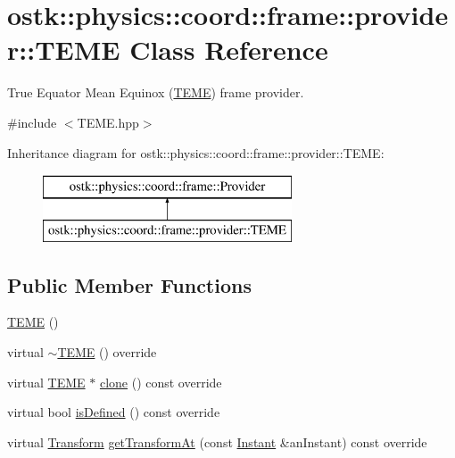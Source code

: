 \hypertarget{classostk_1_1physics_1_1coord_1_1frame_1_1provider_1_1_t_e_m_e}{}\section{ostk\+:\+:physics\+:\+:coord\+:\+:frame\+:\+:provider\+:\+:T\+E\+ME Class Reference}
\label{classostk_1_1physics_1_1coord_1_1frame_1_1provider_1_1_t_e_m_e}


True Equator Mean Equinox (\hyperlink{classostk_1_1physics_1_1coord_1_1frame_1_1provider_1_1_t_e_m_e}{T\+E\+ME}) frame provider.  




{\ttfamily \#include $<$T\+E\+M\+E.\+hpp$>$}

Inheritance diagram for ostk\+:\+:physics\+:\+:coord\+:\+:frame\+:\+:provider\+:\+:T\+E\+ME\+:\begin{figure}[H]
\begin{center}
\leavevmode
\includegraphics[height=2.000000cm]{classostk_1_1physics_1_1coord_1_1frame_1_1provider_1_1_t_e_m_e}
\end{center}
\end{figure}
\subsection*{Public Member Functions}
\begin{DoxyCompactItemize}
\item 
\hyperlink{classostk_1_1physics_1_1coord_1_1frame_1_1provider_1_1_t_e_m_e_a96f18f0fec3fa4ee10fc7a586d9bc01d}{T\+E\+ME} ()
\item 
virtual \hyperlink{classostk_1_1physics_1_1coord_1_1frame_1_1provider_1_1_t_e_m_e_aaea0539a9d40b1f805d1d8e6ee57dc74}{$\sim$\+T\+E\+ME} () override
\item 
virtual \hyperlink{classostk_1_1physics_1_1coord_1_1frame_1_1provider_1_1_t_e_m_e}{T\+E\+ME} $\ast$ \hyperlink{classostk_1_1physics_1_1coord_1_1frame_1_1provider_1_1_t_e_m_e_a10031d843340adafe7d9f4a3a0a4f86c}{clone} () const override
\item 
virtual bool \hyperlink{classostk_1_1physics_1_1coord_1_1frame_1_1provider_1_1_t_e_m_e_a8a1c5599411f152c63b69819e89b0464}{is\+Defined} () const override
\item 
virtual \hyperlink{classostk_1_1physics_1_1coord_1_1_transform}{Transform} \hyperlink{classostk_1_1physics_1_1coord_1_1frame_1_1provider_1_1_t_e_m_e_a167738db76b74c42d29c0edbded94e51}{get\+Transform\+At} (const \hyperlink{classostk_1_1physics_1_1time_1_1_instant}{Instant} \&an\+Instant) const override
\end{DoxyCompactItemize}


